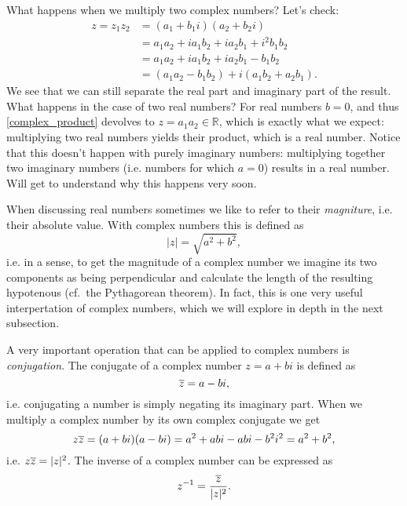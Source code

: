 What happens when we multiply two complex numbers? Let's check:
\begin{align}
	z = z_{1}z_{2} &= \left( a_{1}+b_{1}i \right)\left( a_{2}+b_{2}i \right)\nonumber\\
	&= a_{1}a_{2} + ia_{1}b_{2} + ia_{2}b_{1} + i^{2}b_{1}b_{2}\nonumber\\
	&= a_{1}a_{2} + ia_{1}b_{2} + ia_{2}b_{1} - b_{1}b_{2}\nonumber\\
	&= \left( a_{1}a_{2} - b_{1}b_{2} \right) + i\left( a_{1}b_{2} + a_{2}b_{1} \right).
	\label{eq:complex_product}
\end{align}
We see that we can still separate the real part and imaginary part of the result. What happens in the case of two real numbers? For real numbers $b=0$, and thus \eqref{complex_product} devolves to $z=a_{1}a_{2}\in\mathbb{R}$, which is exactly what we expect: multiplying two real numbers yields their product, which is a real number. Notice that this doesn't happen with purely imaginary numbers: multiplying together two imaginary numbers (i.e. numbers for which $a=0$) results in a real number. Will get to understand why this happens very soon.

When discussing real numbers sometimes we like to refer to their \textit{magniture}, i.e. their absolute value. With complex numbers this is defined as
\begin{equation}
	|z| = \sqrt{a^{2}+b^{2}},
	\label{eq:complex_magnitude}
\end{equation}
i.e. in a sense, to get the magnitude of a complex number we imagine its two components as being perpendicular and calculate the length of the resulting hypotenous (cf.\ the Pythagorean theorem). In fact, this is one very useful interpertation of complex numbers, which we will explore in depth in the next subsection.

A very important operation that can be applied to complex numbers is \emph{conjugation}. The conjugate of a complex number $z=a+bi$ is defined as
\begin{equation}
	\overline{z} = a-bi,
	\label{eq:complex_conjugation}
\end{equation}
i.e. conjugating a number is simply negating its imaginary part. When we multiply a complex number by its own complex conjugate we get
\begin{equation}
	z\overline{z} = (a+bi)(a-bi) = a^{2} + abi - abi - b^{2}i^{2} = a^{2}+b^{2},
	\label{eq:conjugate_product}
\end{equation}
i.e. $z\overline{z} = |z|^{2}$. The inverse of a complex number can be expressed as
\begin{equation}
	z^{-1} = \frac{\overline{z}}{|z|^{2}}.
	\label{eq:complex_inverse}
\end{equation}

